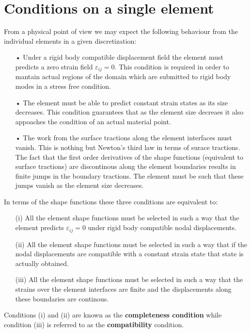\section{Conditions on a single element}
From a physical point of view we may expect the following behaviour from the individual elements in a given discretization:

\begin{itemize}
\item[•] Under a rigid body compatible displacement field the element must predicts a zero strain field ${\varepsilon _{ij}} = 0.$ This condition is required in order to mantain actual regions of the domain which are submitted to rigid body modes in a stress free condition. 
\item[•] The element must be able to predict constant strain states as its size decreases. This condition guarantees that as the element size decreaes it also appoaches the condition of an actual material point.
\item[•] The work from the surface tractions along the element interfaces must vanish. This is nothing but Newton's third law in terms of surace tractions. The fact that the first order derivatives of the shape functions (equivalent to surface tractions) are discontinous along the element boundaries results in finite jumps in the boundary tractions. The element must be such that these jumps vanish as the element size decreases.   
\end{itemize}

In terms of the shape functions these three conditions are equivalent to:


\begin{itemize}
\item[(i)] All the element shape functions must be selected in such a way that the element predicts ${\varepsilon _{ij}} = 0$ under rigid body compatible nodal displacements.
\item[(ii)] All the element shape functions must be selected in such a way that if the nodal displacements are compatible with a constant strain state that state is actually obtained.
\item[(iii)] All the element shape functions must be selected in such a way that the strains over the element interfaces are finite and the displacements along these boundaries are continous. 
\end{itemize}

Conditions (i) and (ii) are known as the {\bf completeness condition} while condition (iii) is referred to as the {\bf compatibility} condition.


